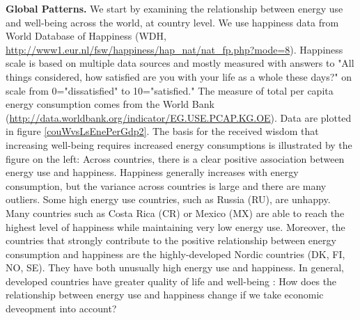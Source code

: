 \documentclass[10pt, letterpaper]{article}
\begin{document}
\begin{spacing}{1.4}
\textbf{Global Patterns.} We start by examining the relationship between energy
use and well-being across the world, at country level.  %
We use happiness data from World Database of Happiness
(WDH, \url{http://www1.eur.nl/fsw/happiness/hap_nat/nat_fp.php?mode=8}). 
  Happiness scale is based on multiple data sources and mostly measured with answers to
"All things considered, how satisfied are you with your life as a whole these
days?" on scale from 0="dissatisfied" to 10="satisfied." 
The measure of total per capita energy consumption comes from the World Bank
(\url{http://data.worldbank.org/indicator/EG.USE.PCAP.KG.OE}). Data are plotted in figure \ref{couWvsLsEnePerGdp2}.
% 
%
 The basis for the received wisdom that increasing well-being requires increased
energy consumptions is illustrated by the figure on the left: Across countries,
there is a clear positive association between energy use and
happiness. Happiness generally increases with energy consumption, but the variance across
countries is large and there are many outliers. Some high energy use countries, such as
Russia (RU),  are unhappy. Many countries such as Costa
Rica (CR) or  Mexico (MX) are able to reach the highest level of happiness while maintaining very low energy use. 
%
%
%
Moreover, the  countries that strongly contribute to the positive
relationship between energy consumption and happiness are the highly-developed
Nordic countries (DK, FI, NO, SE). They have both unusually high energy use and
happiness. In general, developed countries have greater quality of life and
well-being \cite{mazur11}: How does the relationship between energy use and
happiness change if we take economic deveopment into account?
%


\end{spacing}
\end{document}

